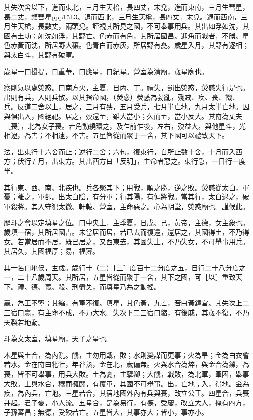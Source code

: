 \documentclass[10pt,fontset=adobe,UTF8,twoside]{ctexrep}
\begin{document}
其失次舍以下，進而東北，三月生天棓，長四丈，末兌，進而東南，三月生彗星，長二丈，類彗星ppp15L3。退而西北，三月生天欃，長四丈，末兌。退而西南，三月生天槍，長數丈，兩頭兌。謹視其所見之國，不可舉事用兵。其出如浮如沈，其國有土功；如沈如浮，其野亡。色赤而有角，其所居國昌。迎角而戰者，不勝。星色赤黃而沈，所居野大穰。色青白而赤灰，所居野有憂。歲星入月，其野有逐相；與太白斗，其野有破軍。

歲星一曰攝提，曰重華，曰應星，曰紀星。營室為清廟，歲星廟也。

察剛氣以處熒惑。曰南方火，主夏，日丙、丁。禮失，罰出熒惑，熒惑失行是也。出則有兵，入則兵散。以其捨命國。（熒惑）熒惑為勃亂，殘賊、疾、喪、饑、兵。反道二舍以上，居之，三月有殃，五月受兵，七月半亡地，九月太半亡地。因與俱出入，國絕祀。居之，殃還至，雖大當小；久而至，當小反大。其南為丈夫［喪］，北為女子喪。若角動繞環之，及乍前乍後，左右，殃益大。與他星斗，光相逮，為害；不相逮，不害。五星皆從而聚于一舍，其下國可以禮致天下。

法，出東行十六舍而止；逆行二舍；六旬，復東行，自所止數十舍，十月而入西方；伏行五月，出東方。其出西方曰「反明」，主命者惡之。東行急，一日行一度半。

其行東、西、南、北疾也。兵各聚其下；用戰，順之勝，逆之敗。熒惑從太白，軍憂；離之，軍卻。出太白陰，有分軍；行其陽，有偏將戰。當其行，太白逮之，破軍殺將。其入守犯太微、軒轅、營室，主命惡之。心為明堂，熒惑廟也。謹候此。

歷斗之會以定填星之位。曰中央土，主季夏，日戊、己，黃帝，主德，女主象也。歲填一宿，其所居國吉。未當居而居，若已去而復還，還居之，其國得土，不乃得女。若當居而不居，既已居之，又西東去，其國失土，不乃失女，不可舉事用兵。其居久，其國福厚；易，福薄。

其一名曰地侯，主歲。歲行十（二）［三］度百十二分度之五，日行二十八分度之一，二十八歲周天。其所居，五星皆從而聚于一舍，其下之國，可［以］重致天下。禮、德、義、殺、刑盡失，而填星乃為之動搖。

贏，為王不寧；其縮，有軍不復。填星，其色黃，九芒，音曰黃鐘宮。其失次上二三宿曰贏，有主命不成，不乃大水。失次下二三宿曰縮，有後戚，其歲不復，不乃天裂若地動。

斗為文太室，填星廟，天子之星也。

木星與土合，為內亂。饑，主勿用戰，敗；水則變謀而更事；火為旱；金為白衣會若水。金在南曰牝牡，年谷熟，金在北，歲偏無。火與水合為焠，與金合為鑠，為喪，皆不可舉事，用兵大敗。土為憂，主孽卿；大饑，戰敗，為北軍，軍困，舉事大敗。土與水合，穰而擁閼，有覆軍，其國不可舉事。出，亡地；入，得地。金為疾，為內兵，亡地。三星若合，其宿地國外內有兵與喪，改立公王。四星合，兵喪并起，君子憂，小人流。五星合，是為易行，有德，受慶，改立大人，掩有四方，子孫蕃昌；無德，受殃若亡。五星皆大，其事亦大；皆小，事亦小。
\end{document}
